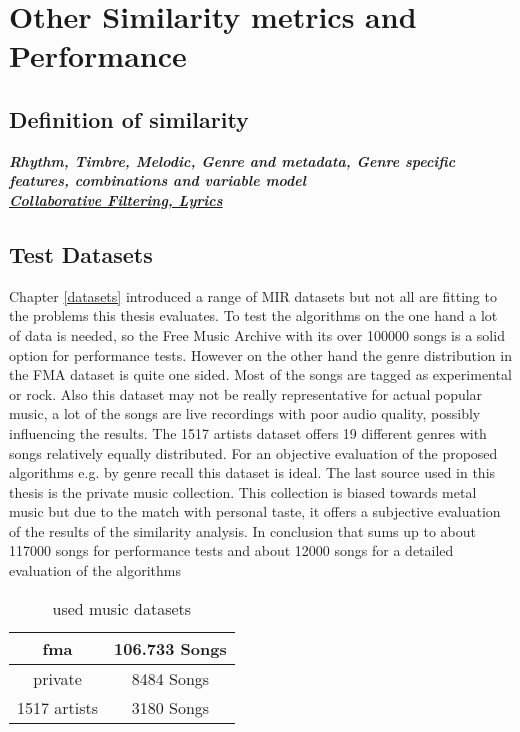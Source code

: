 
\chapter{Other Similarity metrics and Performance}\label{simmet}

\section{Definition of similarity}
\textbf{\textit{Rhythm, Timbre, Melodic, Genre and metadata, Genre specific features, combinations and variable model\\}}
\textit{\underline{\textbf{Collaborative Filtering, Lyrics}}}

\section{Test Datasets}

Chapter \ref{datasets} introduced a range of MIR datasets but not all are fitting to the problems this thesis evaluates. To test the algorithms on the one hand a lot of data is needed, so the Free Music Archive with its over 100000 songs is a solid option for performance tests. However on the other hand the genre distribution in the FMA dataset is quite one sided. Most of the songs are tagged as experimental or rock. Also this dataset may not be really representative for actual popular music, a lot of the songs are live recordings with poor audio quality, possibly influencing the results.
The 1517 artists dataset offers 19 different genres with songs relatively equally distributed. For an objective evaluation of the proposed algorithms e.g. by genre recall this dataset is ideal.
The last source used in this thesis is the private music collection. This collection is biased towards metal music but due to the match with personal taste, it offers a subjective evaluation of the results of the similarity analysis. 
In conclusion that sums up to about 117000 songs for performance tests and about 12000 songs for a detailed evaluation of the algorithms

\begin{table}[h]
	\caption{used music datasets}
	\label{used_dsets}
	\begin{center}
		\begin{tabular}{|c||c|}
			\hline
			fma & 106.733 Songs\\
			\hline
			private & 8484 Songs\\
			\hline
			1517 artists & 3180 Songs\\
			\hline
		\end{tabular}
	\end{center}
\end{table}


